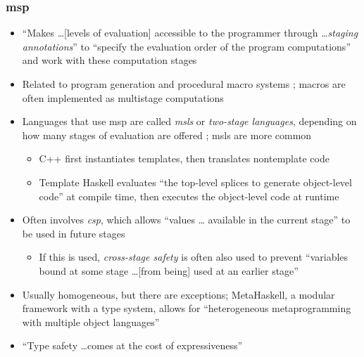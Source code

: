 \subsubsection{\acf{msp} \cite[p.~113:17-20]{lilis_survey_2019}}
\begin{itemize}
      \item ``Makes \dots [levels of evaluation] accessible to the programmer
            through \dots \emph{staging annotations}'' to ``specify the
            evaluation order of the program computations'' and work with these
            computation stages \cite[p.~113:17]{lilis_survey_2019}
      \item Related to program generation and procedural macro systems
            \cite[p.~113:17]{lilis_survey_2019}; macros are often implemented
            as multistage computations \cite[p.~113:18]{lilis_survey_2019}
      \item Languages that use \acs{msp} are called \emph{\acfp{msl}} or
            \emph{two-stage languages}, depending on how many stages of
            evaluation are offered \cite[p.~113:17]{lilis_survey_2019};
            \acsp{msl} are more common \cite[p.~113:31]{lilis_survey_2019}
            \begin{itemize}
                  \item C++ first instantiates templates, then translates
                        nontemplate code \cite[p.~113:19]{lilis_survey_2019}
                  \item Template Haskell evaluates ``the top-level splices
                        to generate object-level code'' at compile time, then
                        executes the object-level code at runtime
                        \cite[p.~113:19]{lilis_survey_2019}
            \end{itemize}
      \item Often involves \emph{\acf{csp}}, which allows ``values \dots
            available in the current stage'' to be used in future stages
            \cite[p.~113:17]{lilis_survey_2019}
            \begin{itemize}
                  \item If this is used, \emph{cross-stage safety} is often
                        also used to prevent ``variables bound at some stage
                        \dots [from being] used at an earlier stage''
                        \cite[p.~113:17]{lilis_survey_2019}
            \end{itemize}
      \item Usually homogeneous, but there are exceptions; MetaHaskell, a
            modular framework \cite[p.~113:19]{lilis_survey_2019} with a type
            system, allows for ``heterogeneous metaprogramming with multiple
            object languages'' \cite[p.~113:18]{lilis_survey_2019}
      \item ``Type safety \dots comes at the cost of expressiveness''
            \cite[p.~113:19]{lilis_survey_2019}
\end{itemize}


